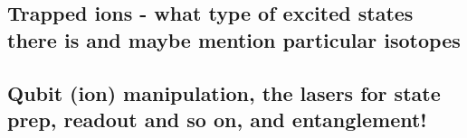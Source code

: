 \subsection{Trapped ions - what type of excited states there is and maybe mention particular isotopes}


\subsection{Qubit (ion) manipulation, the lasers for state prep, readout and so on, and entanglement!}

